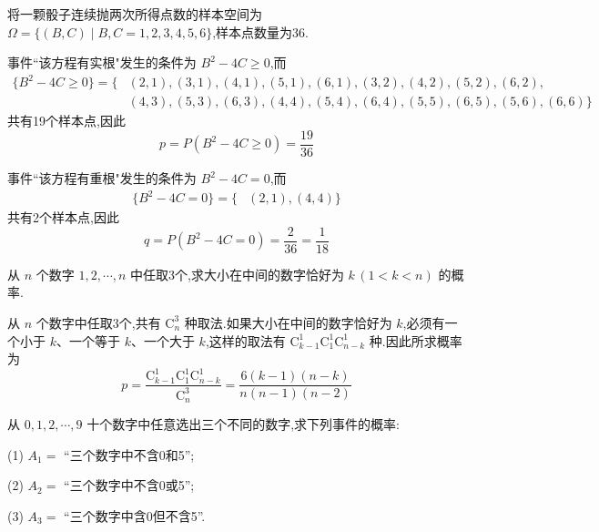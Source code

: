 \begin{solution}
    将一颗骰子连续抛两次所得点数的样本空间为 $\varOmega = \{ (B,C) \mid B,C=1,2,3,4,5,6 \}$,样本点数量为36.
    
    事件``该方程有实根"发生的条件为 $B^2 - 4C \geqslant 0$,而
    $$
    \begin{aligned}
        \{ B^2 - 4C \geqslant 0 \} = \{ & (2,1), (3,1), (4,1), (5,1), (6,1), (3,2), (4,2), (5,2), (6,2), \\
        & (4,3), (5,3), (6,3), (4,4), (5,4), (6,4), (5,5), (6,5), (5,6), (6,6) \}
    \end{aligned}
    $$
    共有19个样本点,因此
    $$
    p = P(B^2 - 4C \geqslant 0) = \dfrac{19}{36}
    $$

    事件``该方程有重根"发生的条件为 $B^2 - 4C = 0$,而
    $$
    \begin{aligned}
        \{ B^2 - 4C = 0 \} = \{ & (2,1), (4,4) \}
    \end{aligned}
    $$
    共有2个样本点,因此
    $$
    q = P(B^2 - 4C = 0) = \dfrac{2}{36} = \dfrac{1}{18}
    $$
\end{solution}

\question 从 $n$ 个数字 $1,2,\cdots,n$ 中任取3个,求大小在中间的数字恰好为 $k \, (1 < k < n)$ 的概率.

\begin{solution}
    从 $n$ 个数字中任取3个,共有 $\mathrm{C}_{n}^3$ 种取法.如果大小在中间的数字恰好为 $k$,必须有一个小于 $k$、一个等于 $k$、一个大于 $k$,这样的取法有 $\mathrm{C}_{k-1}^1 \mathrm{C}_1^1 \mathrm{C}_{n-k}^1$ 种.因此所求概率为
    $$
    p = \dfrac{\mathrm{C}_{k-1}^1 \mathrm{C}_1^1 \mathrm{C}_{n-k}^1}{\mathrm{C}_{n}^3} = \dfrac{6(k-1)(n-k)}{n(n-1)(n-2)}
    $$
\end{solution}

\question 从 $0, 1, 2, \cdots, 9$ 十个数字中任意选出三个不同的数字,求下列事件的概率:

(1) $A_1=$ ``三个数字中不含0和5'';

(2) $A_2=$ ``三个数字中不含0或5'';

(3) $A_3=$ ``三个数字中含0但不含5''.

